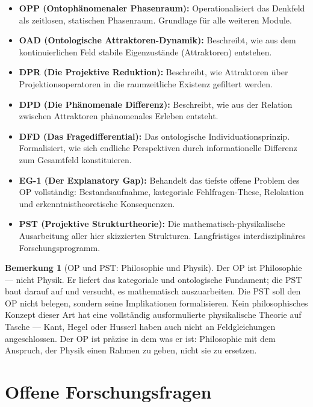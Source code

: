 \documentclass[11pt,a4paper]{article}
\theoremstyle{plain}
\theoremstyle{definition}
\newtheorem{remark}{Bemerkung}[section]
\begin{document}
\begin{itemize}
  \item \textbf{OPP (Ontoph\"{a}nomenaler Phasenraum):} Operationalisiert das Denkfeld
        als zeitlosen, statischen Phasenraum. Grundlage f\"{u}r alle weiteren Module.
  \item \textbf{OAD (Ontologische Attraktoren-Dynamik):} Beschreibt, wie aus dem
        kontinuierlichen Feld stabile Eigenzust\"{a}nde (Attraktoren) entstehen.
  \item \textbf{DPR (Die Projektive Reduktion):} Beschreibt, wie Attraktoren \"{u}ber
        Projektionsoperatoren in die raumzeitliche Existenz gefiltert werden.
  \item \textbf{DPD (Die Ph\"{a}nomenale Differenz):} Beschreibt, wie aus der Relation
        zwischen Attraktoren ph\"{a}nomenales Erleben entsteht.
  \item \textbf{DFD (Das Fragedifferential):} Das ontologische Individuationsprinzip.
        Formalisiert, wie sich endliche Perspektiven durch informationelle Differenz zum
        Gesamtfeld konstituieren.
  \item \textbf{EG-1 (Der Explanatory Gap):} Behandelt das tiefste offene Problem des
        OP vollst\"{a}ndig: Bestandsaufnahme, kategoriale Fehlfragen-These, Relokation
        und erkenntnistheoretische Konsequenzen.
  \item \textbf{PST (Projektive Strukturtheorie):} Die mathematisch-physikalische
        Ausarbeitung aller hier skizzierten Strukturen. Langfristiges interdisziplin\"{a}res
        Forschungsprogramm.
\end{itemize}

\begin{remark}[OP und PST: Philosophie und Physik]
Der OP ist Philosophie --- nicht Physik. Er liefert das kategoriale und ontologische
Fundament; die PST baut darauf auf und versucht, es mathematisch auszuarbeiten. Die PST
soll den OP nicht belegen, sondern seine Implikationen formalisieren. Kein philosophisches
Konzept dieser Art hat eine vollst\"{a}ndig ausformulierte physikalische Theorie auf
Tasche --- Kant, Hegel oder Husserl haben auch nicht an Feldgleichungen angeschlossen.
Der OP ist pr\"{a}zise in dem was er ist: Philosophie mit dem Anspruch, der Physik einen
Rahmen zu geben, nicht sie zu ersetzen.
\end{remark}

\section{Offene Forschungsfragen}
\end{document}
